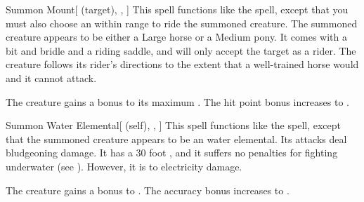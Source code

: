 \lowercase{\hypertarget{spell:Summon Mount}{}}\label{spell:Summon Mount}
\begin{attuneability}[Rank 3]{\hypertarget{spell:Summon Mount}{Summon Mount}}[ (target), , ]
This spell functions like the  spell, except that you must also choose an  within \rngmed range to ride the summoned creature.
The summoned creature appears to be either a Large horse or a Medium pony.
It comes with a bit and bridle and a riding saddle, and will only accept the target as a rider.
The creature follows its rider's directions to the extent that a well-trained horse would and it cannot attack.

\rankline
{} The creature gains a  bonus to its maximum .
 The hit point bonus increases to .
\end{attuneability}
\vspace{0.25em}



\lowercase{\hypertarget{spell:Summon Water Elemental}{}}\label{spell:Summon Water Elemental}
\begin{attuneability}[Rank 3]{\hypertarget{spell:Summon Water Elemental}{Summon Water Elemental}}[ (self), , ]
This spell functions like the  spell, except that the summoned creature appears to be an water elemental.
Its attacks deal bludgeoning damage.
It has a 30 foot , and it suffers no penalties for fighting underwater (see ).
However, it is  to electricity damage.

\rankline
{} The creature gains a  bonus to .
 The accuracy bonus increases to .
\end{attuneability}
\vspace{0.25em}



